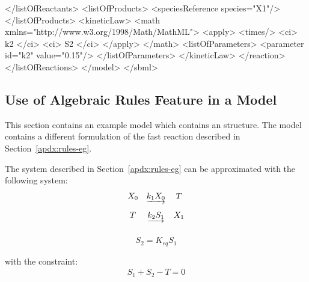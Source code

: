 \documentclass[10pt,twocolumntoc]{cekarticle}
\begin{document}
\begin{example}
                </listOfReactants>
                <listOfProducts>
                    <speciesReference species="X1"/>
                </listOfProducts>
                <kineticLaw>
                    <math xmlns="http://www.w3.org/1998/Math/MathML">
                        <apply>
                            <times/>
                            <ci> k2 </ci>
                            <ci> S2 </ci>
                        </apply>
                    </math>
                    <listOfParameters>
                        <parameter id="k2" value="0.15"/>
                    </listOfParameters>
                </kineticLaw>
            </reaction>
        </listOfReactions>
    </model>
</sbml>
\end{example}

\subsection{Use of Algebraic Rules Feature in a Model}
\label{sec:algeraiceg}

This section contains an example model which contains an
 structure.  The model contains a different
formulation of the fast reaction described in
Section~\ref{apdx:rules-eg}.

The system described in Section~\ref{apdx:rules-eg} can be
approximated with the following system:
\begin{equation*}
  \begin{array}{@{}ccc@{}}
    X_0 & \underrightarrow{k_1 X_0} & T \\ \\[-4pt]
    T & \underrightarrow{k_2 S_1} & X_1\\ \\[-4pt]
  \end{array}
\end{equation*}
\begin{equation*}
  \begin{array}{ll}
    S_2 = K_{eq} S_1\\ \\[-4pt]
  \end{array}
\end{equation*}
with the constraint:
\begin{equation*}
  \begin{array}{ll}
    S_1 + S_2 - T = 0\\ \\[-4pt]
  \end{array}
\end{equation*}
\end{document}
